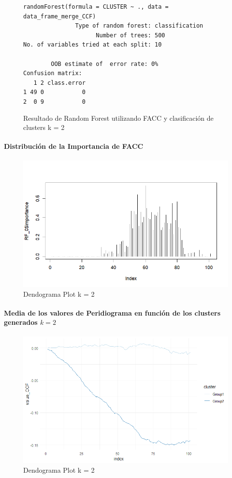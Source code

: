 \begin{figure}[H]
    \centering
    \begin{lstlisting}[frame=single, basicstyle=\small\ttfamily]
        randomForest(formula = CLUSTER ~ ., data = data_frame_merge_CCF) 
               Type of random forest: classification
                     Number of trees: 500
No. of variables tried at each split: 10

        OOB estimate of  error rate: 0%
Confusion matrix:
   1 2 class.error
1 49 0           0
2  0 9           0
    \end{lstlisting}
    \caption{Resultado de Random Forest utilizando FACC y clasificación de clusters k = 2}\label{fig:random_forest_ccf_result_RF_1}
\end{figure}

\paragraph{Distribución de la Importancia de FACC}

\begin{figure}[H]
    \centering
    \includegraphics[scale = 0.8]{img/06-5-ccf.png}
    \caption{Dendograma Plot k = 2}
    \label{fig:ccf_imp}
\end{figure}

\paragraph{Media de los valores de Peridiograma en función de los clusters generados $k = 2$}

\begin{figure}[H]
    \centering
    \includegraphics[scale = 0.8]{img/06-6-ccf.png}
    \caption{Dendograma Plot k = 2}
    \label{fig:ccf_cls}
\end{figure}